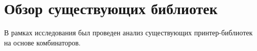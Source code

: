 \section{Обзор существующих библиотек}

В рамках исследования был проведен анализ существующих принтер-библиотек на основе комбинаторов.




